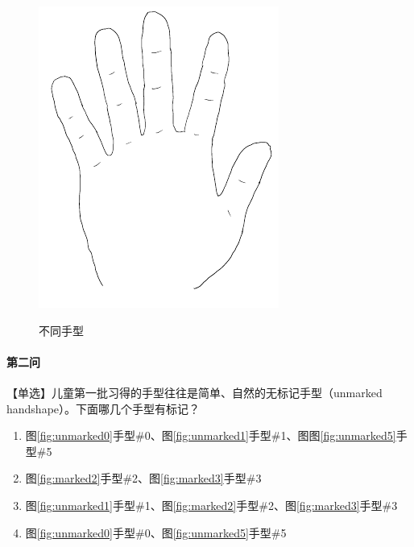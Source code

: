 \documentclass[12pt, a4paper, oneside]{ctexart}
\begin{document}
\begin{figure}[H]
{\begin{minipage}[t]{0.33\linewidth}
        \includegraphics[width=\linewidth]{fig/unmarked5.pdf}
        \end{minipage}%
        \label{fig:unmarked5}%
        }%
        \centering
    \caption{不同手型}
    \label{fig:不同手型}
\end{figure}

\paragraph{第二问}
【单选】儿童第一批习得的手型往往是简单、自然的无标记手型（unmarked handshape）。下面哪几个手型有标记？
\begin{enumerate}[label=\Alph*.]
    \item 图\ref{fig:unmarked0}手型\#0、图\ref{fig:unmarked1}手型\#1、图图\ref{fig:unmarked5}手型\#5
    \item 图\ref{fig:marked2}手型\#2、图\ref{fig:marked3}手型\#3
    \item 图\ref{fig:unmarked1}手型\#1、图\ref{fig:marked2}手型\#2、图\ref{fig:marked3}手型\#3
    \item 图\ref{fig:unmarked0}手型\#0、图\ref{fig:unmarked5}手型\#5
\end{enumerate}
\end{document}
